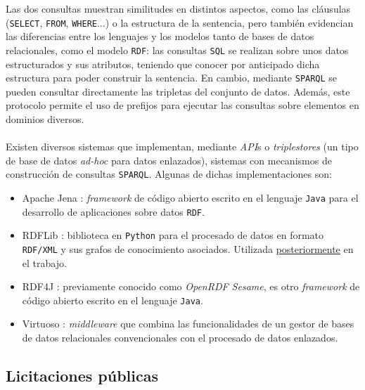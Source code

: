            \noindent Las dos consultas muestran similitudes en distintos aspectos, como las cláusulas (\texttt{SELECT}, \texttt{FROM}, \texttt{WHERE}...) o la estructura de la sentencia, pero también evidencian las diferencias entre los lenguajes y los modelos tanto de bases de datos relacionales, como el modelo \texttt{RDF}: las consultas \texttt{SQL} se realizan sobre unos datos estructurados y sus atributos, teniendo que conocer por anticipado dicha estructura para poder construir la sentencia. En cambio, mediante \texttt{SPARQL} se pueden consultar directamente las tripletas del conjunto de datos. Además, este protocolo permite el uso de prefijos para ejecutar las consultas sobre elementos en dominios diversos.
            \\ \\
            Existen diversos sistemas que implementan, mediante \textit{API}s o \textit{triplestores} (un tipo de base de datos \textit{ad-hoc} para datos enlazados), sistemas con mecanismos de construcción de consultas \texttt{SPARQL}. Algunas de dichas implementaciones son:
            \\
            \begin{itemize}
                \item Apache Jena \cite{JENA}: \textit{framework} de código abierto escrito en el lenguaje \texttt{Java} para el desarrollo de aplicaciones sobre datos \texttt{RDF}.
                \item RDFLib \cite{RDFLIB}: biblioteca en \texttt{Python} para el procesado de datos en formato \texttt{RDF/XML} y sus grafos de conocimiento asociados. Utilizada  \hyperref[subsec:rdflib]{posteriormente} en el trabajo.
                \item RDF4J \cite{RDF4J}: previamente conocido como \textit{OpenRDF Sesame}, es otro \textit{framework} de código abierto escrito en el lenguaje \texttt{Java}.
                \item Virtuoso \cite{VIRTUOSO}: \textit{middleware} que combina las funcionalidades de un gestor de bases de datos relacionales convencionales con el procesado de datos enlazados.
            \end{itemize}
        
    \subsection{Licitaciones públicas}
